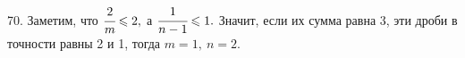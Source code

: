 70. Заметим, что $\cfrac{2}{m}\leqslant2,$ а $\cfrac{1}{n-1}\leqslant1.$ Значит, если их сумма равна 3, эти дроби в точности равны 2 и 1, тогда $m=1,\ n=2.$\\
